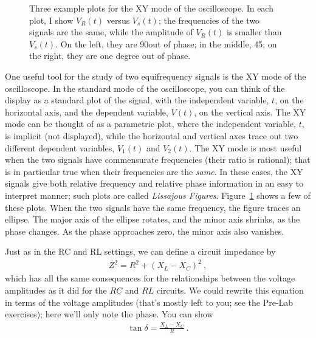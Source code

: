 \documentclass[12pt]{article}
\begin{document}
\begin{figure}
  \centering
  \caption{Three example plots for the XY mode of the oscilloscope.
    In each plot, I show $V_R(t)$ versus $V_s(t)$; the frequencies of
    the two signals are the same, while the amplitude of $V_R(t)$ is
    smaller than $V_s(t)$.  On the left, they are 90\textdegree out of
    phase; in the middle, 45\textdegree; on the right, they are one
    degree out of phase.}
  \label{fig:lissajous}
\end{figure}
One useful tool for the study of two equifrequency signals is the XY
mode of the oscilloscope.  In the standard mode of the oscilloscope,
you can think of the display as a standard plot of the signal, with
the independent variable, $t$, on the horizontal axis, and the
dependent variable, $V(t)$, on the vertical axis.  The XY mode can be
thought of as a parametric plot, where the independent variable, $t$,
is implicit (not displayed), while the horizontal and vertical axes
trace out two different dependent variables, $V_1(t)$ and $V_2(t)$.
The XY mode is most useful when the two signals have commensurate
frequencies (their ratio is rational); that is in particular true when
their frequencies are the \textit{same}.  In these cases, the XY
signals give both relative frequency and relative phase information in
an easy to interpret manner; such plots are called \textit{Lissajous
  Figures}. Figure~\ref{fig:lissajous} shows a few of these plots.
When the two signals have the same frequency, the figure traces an
ellipse.  The major axis of the ellipse rotates, and the minor axis
shrinks, as the phase changes.  As the phase approaches zero, the
minor axis also vanishes.

Just as in the RC and RL settings, we can define a circuit impedance
by
\begin{gather*}
  Z^2 = R^2 + \left(X_L-X_C\right)^2\ ,
\end{gather*}
which has all the same consequences for the relationships between the
voltage amplitudes as it did for the $RC$ and $RL$ circuits.  We could
rewrite this equation in terms of the voltage amplitudes (that's
mostly left to you; see the Pre-Lab exercises); here we'll only note
the phase.  You can show
\begin{gather*}
  \tan \delta = \frac{X_L - X_C}{R}\ .
\end{gather*}
\end{document}
